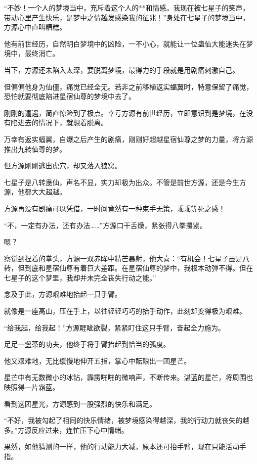 
\begin{this_body}

“不妙！一个人的梦境当中，充斥着这个人的**和情感。我现在被七星子的笑声，带动心里产生快乐，是梦中之情越发感染我的征兆！”身处在七星子的梦境当中，方源心中直叫糟糕。

他有前世经历，自然明白梦境中的凶险，一不小心，就能让一位蛊仙大能迷失在梦境中，最终消亡。

当下，方源还未陷入太深，要脱离梦境，最得力的手段就是用剧痛刺激自己。

但偏偏他身为仙僵，痛觉已经全无。若非之前移植返实蝠翼时，特意保留了痛觉，恐怕就要彻底陷进星宿仙尊的梦境中去了。

刚刚的遭遇，简直惊险到了极点。幸亏方源有前世经历，立即意识到是梦境，在没有陷进去的情况下，就想着脱离。

万幸有返实蝠翼，自爆之后产生的剧痛，刚刚好超越星宿仙尊之梦的力量，将方源推出九转仙尊的梦。

但方源刚刚逃出虎穴，却又落入狼窝。

七星子是八转蛊仙，声名不显，实力却极为出众。不管是前世方源，还是今生方源，他都大大超越。

方源再没有剧痛可以凭借，一时间竟然有一种束手无策，乖乖等死之感！

“不，一定有办法，还有办法……”方源口干舌燥，紧张得八拳攥紧。

嗯？

察觉到捏着的拳头，方源一双赤眸中精芒暴射，他大喜：“有机会！七星子虽是八转，但到底和星宿仙尊有着巨大差距。在星宿仙尊的梦中，我根本动弹不得。但在七星子的这个梦里，我却并未完全丧失行动之能。”

念及于此，方源艰难地抬起一只手臂。

就像是一座高山，压在手上，以往轻轻巧巧的抬手动作，此刻却变得极为艰难。

“给我起，给我起！”方源睚眦欲裂，紧紧盯住这只手臂，奋起全力施为。

足足一盏茶的功夫，他终于将手臂抬起到恰当的弧度。

他又艰难地，无比缓慢地伸开五指，掌心中酝酿出一团星芒。

星芒中有无数微小的冰钻，霹雳啪啪的微响声，不断传来。湛蓝的星芒，将周围也映照得一片霜蓝。

看到这团星光，方源感到一股强烈的快乐和满足。

“不好，我被勾起了相同的快乐情绪，被梦境感染得越深，我的行动力就丧失的越多。”方源反应过来，连忙压下心中情绪。

果然，如他猜测的一样，他的行动能力大减，原本还可抬手臂，现在只能活动手指。


\end{this_body}
